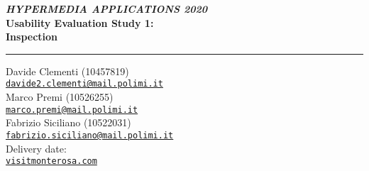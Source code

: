 \makeatletter
\begin{titlepage}
	\begin{flushleft}
		\textit{\textbf{HYPERMEDIA APPLICATIONS 2020}}\\
		\vspace{20pt}
		{\Huge \bfseries \sffamily Usability Evaluation Study 1:\\Inspection}
		\vspace{10pt}
		\rule{\textwidth}{2pt} 
		\vspace{10pt}  
	\end{flushleft} 
	\begin{center}
		Davide Clementi (10457819)\\[0cm]
		{\small \href{mailto:davide2.clementi@mail.polimi.it}{\texttt{davide2.clementi@mail.polimi.it}}}
		\\[0.5cm]
		Marco Premi (10526255)\\[0cm]
		{\small \href{mailto:marco.premi@mail.polimi.it}{\texttt{marco.premi@mail.polimi.it}}}
		\\[0.5cm]
		Fabrizio Siciliano (10522031)\\[0cm]
		{\small \href{mailto:fabrizio.siciliano@mail.polimi.it}{\texttt{fabrizio.siciliano@mail.polimi.it}}}\\
		\vspace{20pt}
		Delivery date: \@date\\[5ex] 
		\vspace{20pt}
		\href{https://www.visitmonterosa.com/}{\texttt{visitmonterosa.com}}
		\fontsize{15pt}{12pt}\selectfont
	\end{center} 
\end{titlepage} 
\makeatother   
\setcounter{page}{1} %